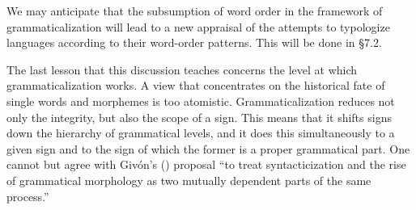 We may anticipate that the subsumption of word order in the framework of grammaticalization will lead to a new appraisal of the attempts to typologize languages according to their word-order patterns. This will be done in §7.2.

The last lesson that this discussion teaches concerns the level at which grammaticalization works. A view that concentrates on the historical fate of single words and morphemes is too atomistic. Grammaticalization reduces not only the integrity, but also the scope of a sign. This means that it shifts signs down the hierarchy of grammatical levels, and it does this simultaneously to a given sign and to the sign of which the former is a proper grammatical part. One cannot but agree with Givón's (\citeyear[94]{Givón1979}) proposal “to treat syntacticization and the rise of grammatical morphology as two mutually dependent parts of the same process.”

